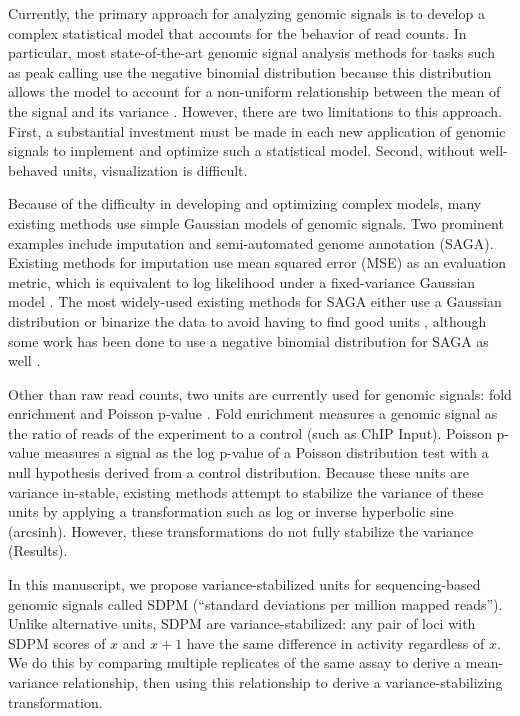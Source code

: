 \documentclass[11pt]{article}
\begin{document}
Currently, the primary approach for analyzing genomic signals is to develop a complex statistical model that accounts for the behavior of read counts. 
In particular, most state-of-the-art genomic signal analysis methods for tasks such as peak calling use the negative binomial distribution because this distribution allows the model to account for a non-uniform relationship between the mean of the signal and its variance \cite{zhang2008model}. 
However, there are two limitations to this approach. 
First, a substantial investment must be made in each new application of genomic signals to implement and optimize such a statistical model.
Second, without well-behaved units, visualization is difficult.

Because of the difficulty in developing and optimizing complex models, many existing methods use simple Gaussian models of genomic signals.
Two prominent examples include imputation and semi-automated genome annotation (SAGA).
Existing methods for imputation use mean squared error (MSE) as an evaluation metric, which is equivalent to log likelihood under a fixed-variance Gaussian model \cite{ernst2015large,schreiber2018multi}. 
The most widely-used existing methods for SAGA either use a Gaussian distribution \cite{chan2017segway} or binarize the data to avoid having to find good units \cite{ernst2012chromhmm}, although some work has been done to use a negative binomial distribution for SAGA as well \cite{mammana2015chromatin}. 

Other than raw read counts, two units are currently used for genomic signals: fold enrichment and Poisson p-value \cite{hoffman2012integrative,kundaje2015integrative}. 
Fold enrichment measures a genomic signal as the ratio of reads of the experiment to a control (such as ChIP Input).
Poisson p-value measures a signal as the log p-value of a Poisson distribution test with a null hypothesis derived from a control distribution. 
Because these units are variance in-stable, existing methods attempt to stabilize the variance of these units by applying a transformation such as log or inverse hyperbolic sine (arcsinh). 
However, these transformations do not fully stabilize the variance (Results). 

In this manuscript, we propose variance-stabilized units for sequencing-based genomic signals called SDPM (``standard deviations per million mapped reads'').
Unlike alternative units, SDPM are variance-stabilized: any pair of loci with SDPM scores of $x$ and $x+1$ have the same difference in activity regardless of $x$. 
We do this by comparing multiple replicates of the same assay to derive a mean-variance relationship, then using this relationship to derive a variance-stabilizing transformation.
\end{document}

